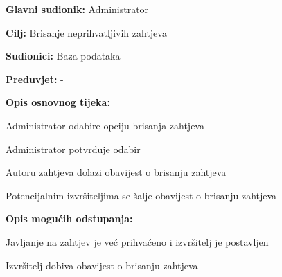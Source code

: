 			\noindent {}
			\begin{packed_item}
				
				\item \textbf{Glavni sudionik: }Administrator
				\item  \textbf{Cilj:} Brisanje neprihvatljivih zahtjeva 
				\item  \textbf{Sudionici:} Baza podataka
				\item  \textbf{Preduvjet:} -
				\item  \textbf{Opis osnovnog tijeka:}
				
				\item[] \begin{packed_enum}
					
					\item Administrator odabire opciju brisanja zahtjeva
					\item Administrator potvrđuje odabir
					\item Autoru zahtjeva dolazi obavijest o brisanju zahtjeva
					\item Potencijalnim izvršiteljima se šalje obavijest o brisanju zahtjeva
				\end{packed_enum}
				
				\item  \textbf{Opis mogućih odstupanja:}
				
				\item[] \begin{packed_item}
					
					\item[2.a] Javljanje na zahtjev je već prihvaćeno i izvršitelj je postavljen
					\item[] \begin{packed_enum}
						
						\item Izvršitelj dobiva obavijest o brisanju zahtjeva
						
					\end{packed_enum}
					
				\end{packed_item}
			\end{packed_item}
		
